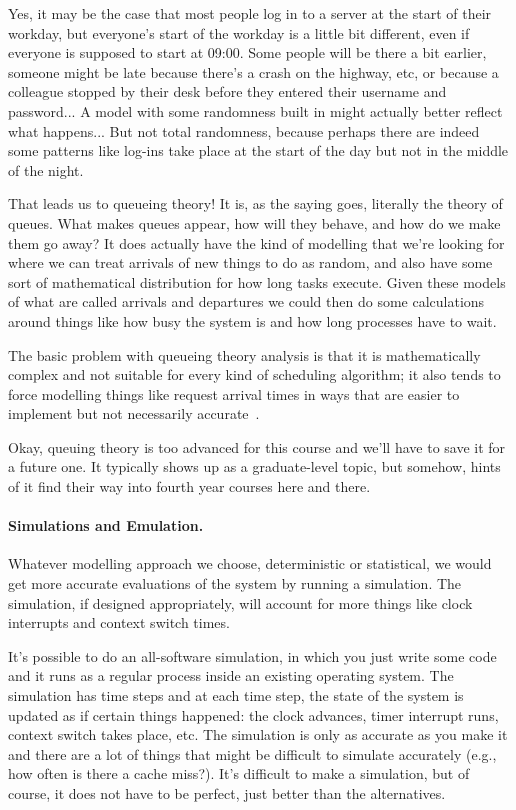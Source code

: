 Yes, it may be the case that most people log in to a server at the start of their workday, but everyone's start of the workday is a little bit different, even if everyone is supposed to start at 09:00. Some people will be there a bit earlier, someone might be late because there's a crash on the highway, etc, or because a colleague stopped by their desk before they entered their username and password...  A model with some randomness built in might actually better reflect what happens... But not total randomness, because perhaps there are indeed some patterns like log-ins take place at the start of the day but not in the middle of the night.

That leads us to queueing theory! It is, as the saying goes, literally the theory of queues. What makes queues appear, how will they behave, and how do we make them go away? It does actually have the kind of modelling that we're looking for where we can treat arrivals of new things to do as random, and also have some sort of mathematical distribution for how long tasks execute. Given these models of what are called arrivals and departures we could then do some calculations around things like how busy the system is and how long processes have to wait.

The basic problem with queueing theory analysis is that it is mathematically complex and not suitable for every kind of scheduling algorithm; it also tends to force modelling things like request arrival times in ways that are easier to implement but not necessarily accurate~\cite{osc}.

Okay, queuing theory is too advanced for this course and we'll have to save it for a future one. It typically shows up as a graduate-level topic, but somehow, hints of it find their way into fourth year courses here and there.

\paragraph{Simulations and Emulation.}
Whatever modelling approach we choose, deterministic or statistical, we would get more accurate evaluations of the system by running a simulation. The simulation, if designed appropriately, will account for more things like clock interrupts and context switch times.

It's possible to do an all-software simulation, in which you just write some code and it runs as a regular process inside an existing operating system. The simulation has time steps and at each time step, the state of the system is updated as if certain things happened: the clock advances, timer interrupt runs, context switch takes place, etc. The simulation is only as accurate as you make it and there are a lot of things that might be difficult to simulate accurately (e.g., how often is there a cache miss?). It's difficult to make a simulation, but of course, it does not have to be perfect, just better than the alternatives.

